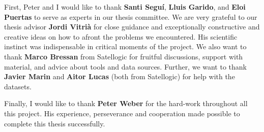 \documentclass[
11pt, %
english, %
onehalfspacing, %
liststotoc, %
headsepline, %
]{MastersDoctoralThesis} %
\begin{document}

\begin{acknowledgements}
\addchaptertocentry{\acknowledgementname} %

First, Peter and I would like to thank \textbf{Santi Seguí}, \textbf{Lluis Garido}, and \textbf{Eloi Puertas} to serve as experts in our thesis committee.
We are very grateful to our thesis advisor \textbf{Jordi Vitrià} for close guidance and exceptionally constructive and creative ideas on how to afront the problems we encountered. His scientific instinct was indispensable in critical moments of the project.
We also want to thank \textbf{Marco Bressan} from Satellogic for fruitful discussions, support with material, and advice about tools and data sources. Further, we want to thank \textbf{Javier Marin} and \textbf{Aitor Lucas} (both from Satellogic) for help with the datasets.

Finally, I would like to thank \textbf{Peter Weber} for the hard-work throughout all this project. His experience, perseverance and cooperation made possible to complete this thesis successfully.

\end{acknowledgements}




\mainmatter %

\pagestyle{thesis} %



\tableofcontents



 
 




\end{document}
